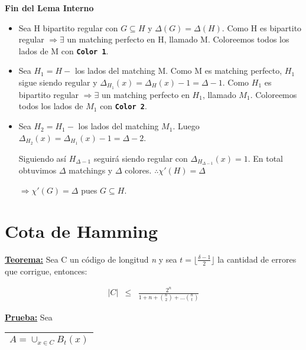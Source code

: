 \documentclass[12pt,a4paper]{report}
\begin{document}
		\textbf{Fin del Lema Interno}

		\vspace{5mm}
		\begin{itemize}
			\item Sea H bipartito regular con $G \subseteq H$ y $\Delta(G) = \Delta(H)$. Como H es bipartito regular $\Rightarrow \exists$ un matching perfecto en H, llamado M. Coloreemos todos los lados de M con \textbf{\texttt{Color 1}}.

			\item Sea $H_{1} = H - $ los lados del matching M. Como M es matching perfecto, $H_{1}$ sigue siendo regular y $\Delta_{H_{1}}(x) = \Delta_{H}(x) - 1 = \Delta - 1$. Como $H_{1}$ es bipartito regular $\Rightarrow \exists$ un matching perfecto en $H_{1}$, llamado $M_{1}$. Coloreemos todos los lados de $M_{1}$ con \textbf{\texttt{Color 2}}.

			\item Sea $H_{2} = H_{1} - $ los lados del matching $M_{1}$. Luego $\Delta_{H_{2}}(x) = \Delta_{H_{1}}(x) - 1 = \Delta - 2$.


			Siguiendo así $H_{\Delta - 1}$ seguirá siendo regular con $ \Delta_{H_{\Delta - 1}}(x) = 1$. En total obtuvimos $ \Delta $ matchings y $ \Delta $ colores. $\therefore \chi '(H) = \Delta$

			\begin{center}
				$\Rightarrow \chi ' (G) = \Delta$ pues $G \subseteq H$.
			\end{center}
		\end{itemize}

	\section{Cota de Hamming}

		\textbf{\underline{Teorema:}} Sea C un código de longitud \textit{n} y sea $ t = \lfloor \frac{\delta - 1}{2} \rfloor$ la cantidad de errores que corrigue, entonces:

		\begin{eqnarray}
			\nonumber \lvert C \rvert &\leq & \frac{2^{n}}{1 + n + {n \choose 2} + \dotsc {n \choose t}}
		\end{eqnarray}

		\textbf{\underline{Prueba:}} Sea \begin{tabular}{|c|} \hline $ A = \cup_{x \in C} B_{t}(x) $ \\ \hline \end{tabular}
\end{document}
